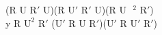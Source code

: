 (R U $\text{R}'$ U)(R $\text{U}'$ $\text{R}'$ U)(R U$\text{ }^2$ $\text{R}'$)\\
y R $\text{U}^2$ $\text{R}'$ ($\text{U}'$ R U $\text{R}'$)($\text{U}'$ R $\text{U}'$ $\text{R}'$)\\
